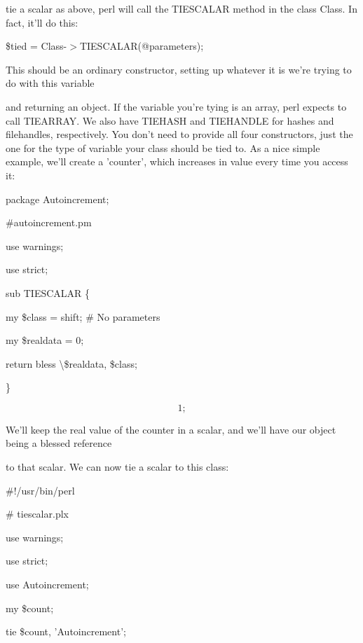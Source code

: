 \documentclass[a4paper,11pt]{book}
\begin{document}
\noindent tie a scalar as above, perl will call the TIESCALAR method in the class Class. In fact, it'll do this:

\noindent 

\noindent \$tied = Class-$>$TIESCALAR(@parameters);

\noindent 

\noindent This should be an ordinary constructor, setting up whatever it is we're trying to do with this variable

\noindent and returning an object. If the variable you're tying is an array, perl expects to call TIEARRAY. We also have TIEHASH and TIEHANDLE for hashes and filehandles, respectively. You don't need to provide all four constructors, just the one for the type of variable your class should be tied to. As a nice simple example, we'll create a 'counter', which increases in value every time you access it:

\noindent 

\noindent package Autoincrement;

\noindent \#autoincrement.pm

\noindent use warnings;

\noindent use strict;

\noindent 

\noindent sub TIESCALAR \{

\noindent my \$class = shift; \# No parameters

\noindent my \$realdata = 0;

\noindent return bless \textbackslash \$realdata, \$class;

\noindent \}

\noindent 

\[1;\] 


\noindent We'll keep the real value of the counter in a scalar, and we'll have our object being a blessed reference

\noindent to that scalar. We can now tie a scalar to this class:

\noindent 

\noindent \#!/usr/bin/perl

\noindent \# tiescalar.plx

\noindent use warnings;

\noindent use strict;

\noindent use Autoincrement;

\noindent 

\noindent my \$count;

\noindent tie \$count, 'Autoincrement';
\end{document}
